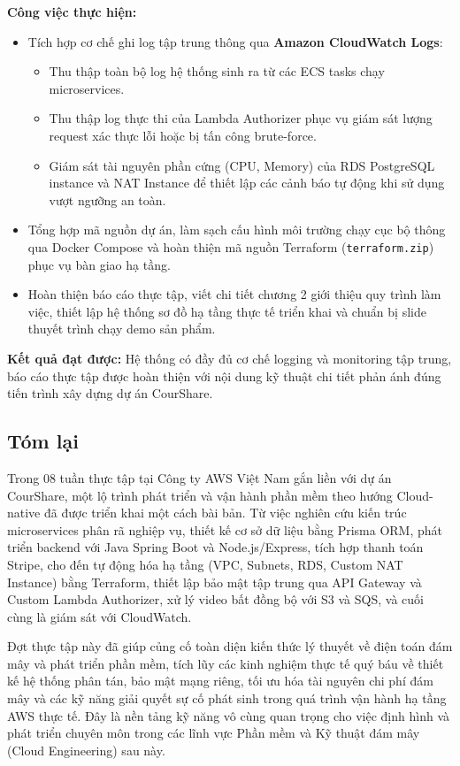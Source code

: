 \textbf{Công việc thực hiện:}
\begin{itemize}
    \item Tích hợp cơ chế ghi log tập trung thông qua \textbf{Amazon CloudWatch Logs}:
    \begin{itemize}
        \item Thu thập toàn bộ log hệ thống sinh ra từ các ECS tasks chạy microservices.
        \item Thu thập log thực thi của Lambda Authorizer phục vụ giám sát lượng request xác thực lỗi hoặc bị tấn công brute-force.
        \item Giám sát tài nguyên phần cứng (CPU, Memory) của RDS PostgreSQL instance và NAT Instance để thiết lập các cảnh báo tự động khi sử dụng vượt ngưỡng an toàn.
    \end{itemize}
    \item Tổng hợp mã nguồn dự án, làm sạch cấu hình môi trường chạy cục bộ thông qua Docker Compose và hoàn thiện mã nguồn Terraform (\texttt{terraform.zip}) phục vụ bàn giao hạ tầng.
    \item Hoàn thiện báo cáo thực tập, viết chi tiết chương 2 giới thiệu quy trình làm việc, thiết lập hệ thống sơ đồ hạ tầng thực tế triển khai và chuẩn bị slide thuyết trình chạy demo sản phẩm.
\end{itemize}

\textbf{Kết quả đạt được:} Hệ thống có đầy đủ cơ chế logging và monitoring tập trung, báo cáo thực tập được hoàn thiện với nội dung kỹ thuật chi tiết phản ánh đúng tiến trình xây dựng dự án CourShare.

\subsection*{Tóm lại}

Trong 08 tuần thực tập tại Công ty AWS Việt Nam gắn liền với dự án CourShare, một lộ trình phát triển và vận hành phần mềm theo hướng Cloud-native đã được triển khai một cách bài bản. Từ việc nghiên cứu kiến trúc microservices phân rã nghiệp vụ, thiết kế cơ sở dữ liệu bằng Prisma ORM, phát triển backend với Java Spring Boot và Node.js/Express, tích hợp thanh toán Stripe, cho đến tự động hóa hạ tầng (VPC, Subnets, RDS, Custom NAT Instance) bằng Terraform, thiết lập bảo mật tập trung qua API Gateway và Custom Lambda Authorizer, xử lý video bất đồng bộ với S3 và SQS, và cuối cùng là giám sát với CloudWatch. 

Đợt thực tập này đã giúp củng cố toàn diện kiến thức lý thuyết về điện toán đám mây và phát triển phần mềm, tích lũy các kinh nghiệm thực tế quý báu về thiết kế hệ thống phân tán, bảo mật mạng riêng, tối ưu hóa tài nguyên chi phí đám mây và các kỹ năng giải quyết sự cố phát sinh trong quá trình vận hành hạ tầng AWS thực tế. Đây là nền tảng kỹ năng vô cùng quan trọng cho việc định hình và phát triển chuyên môn trong các lĩnh vực Phần mềm và Kỹ thuật đám mây (Cloud Engineering) sau này.
